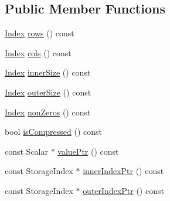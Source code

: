 \subsection*{Public Member Functions}
\begin{DoxyCompactItemize}
\item 
\mbox{\hyperlink{struct_eigen_1_1_eigen_base_a554f30542cc2316add4b1ea0a492ff02}{Index}} \mbox{\hyperlink{class_eigen_1_1_sparse_map_base_3_01_derived_00_01_read_only_accessors_01_4_a3cdd6cab0abd7ac01925a695fc315d34}{rows}} () const
\item 
\mbox{\hyperlink{struct_eigen_1_1_eigen_base_a554f30542cc2316add4b1ea0a492ff02}{Index}} \mbox{\hyperlink{class_eigen_1_1_sparse_map_base_3_01_derived_00_01_read_only_accessors_01_4_a0fc44f3781a869a3a410edd6691fd899}{cols}} () const
\item 
\mbox{\hyperlink{struct_eigen_1_1_eigen_base_a554f30542cc2316add4b1ea0a492ff02}{Index}} \mbox{\hyperlink{class_eigen_1_1_sparse_map_base_3_01_derived_00_01_read_only_accessors_01_4_a0df6dba8d71e0fb15b2995510853f83e}{inner\+Size}} () const
\item 
\mbox{\hyperlink{struct_eigen_1_1_eigen_base_a554f30542cc2316add4b1ea0a492ff02}{Index}} \mbox{\hyperlink{class_eigen_1_1_sparse_map_base_3_01_derived_00_01_read_only_accessors_01_4_a3d6ede19db6d42074ae063bc876231b1}{outer\+Size}} () const
\item 
\mbox{\hyperlink{struct_eigen_1_1_eigen_base_a554f30542cc2316add4b1ea0a492ff02}{Index}} \mbox{\hyperlink{class_eigen_1_1_sparse_map_base_3_01_derived_00_01_read_only_accessors_01_4_a753e975b7b3643d821dc061141786870}{non\+Zeros}} () const
\item 
bool \mbox{\hyperlink{class_eigen_1_1_sparse_map_base_3_01_derived_00_01_read_only_accessors_01_4_aafab4afa7ab2ff89eff049d4c71e2ce4}{is\+Compressed}} () const
\item 
const Scalar $\ast$ \mbox{\hyperlink{class_eigen_1_1_sparse_map_base_3_01_derived_00_01_read_only_accessors_01_4_a574ea9371c22eabebdda21c0787312dc}{value\+Ptr}} () const
\item 
const Storage\+Index $\ast$ \mbox{\hyperlink{class_eigen_1_1_sparse_map_base_3_01_derived_00_01_read_only_accessors_01_4_ab044564756f472877b2c1a5706e540e2}{inner\+Index\+Ptr}} () const
\item 
const Storage\+Index $\ast$ \mbox{\hyperlink{class_eigen_1_1_sparse_map_base_3_01_derived_00_01_read_only_accessors_01_4_a24c55dd8de4aca30e7c90b69aa5dca6b}{outer\+Index\+Ptr}} () const
\item 

\end{DoxyCompactItemize}

